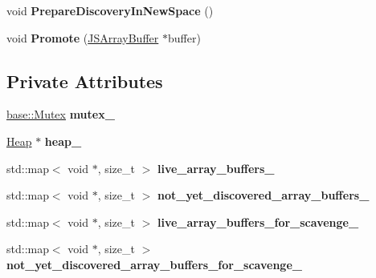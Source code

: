 \begin{DoxyCompactItemize}
\item 
void {\bfseries Prepare\+Discovery\+In\+New\+Space} ()\hypertarget{classv8_1_1internal_1_1_array_buffer_tracker_a8498b5c0a908de9e03a3e48288857129}{}\label{classv8_1_1internal_1_1_array_buffer_tracker_a8498b5c0a908de9e03a3e48288857129}

\item 
void {\bfseries Promote} (\hyperlink{classv8_1_1internal_1_1_j_s_array_buffer}{J\+S\+Array\+Buffer} $\ast$buffer)\hypertarget{classv8_1_1internal_1_1_array_buffer_tracker_a2192e34668b32c0138186f3ec5a1069e}{}\label{classv8_1_1internal_1_1_array_buffer_tracker_a2192e34668b32c0138186f3ec5a1069e}

\end{DoxyCompactItemize}
\subsection*{Private Attributes}
\begin{DoxyCompactItemize}
\item 
\hyperlink{classv8_1_1base_1_1_mutex}{base\+::\+Mutex} {\bfseries mutex\+\_\+}\hypertarget{classv8_1_1internal_1_1_array_buffer_tracker_af46b03f57cc3c41ec2804aaaca724941}{}\label{classv8_1_1internal_1_1_array_buffer_tracker_af46b03f57cc3c41ec2804aaaca724941}

\item 
\hyperlink{classv8_1_1internal_1_1_heap}{Heap} $\ast$ {\bfseries heap\+\_\+}\hypertarget{classv8_1_1internal_1_1_array_buffer_tracker_ade46351b214fce01c0d6274edae30b9b}{}\label{classv8_1_1internal_1_1_array_buffer_tracker_ade46351b214fce01c0d6274edae30b9b}

\item 
std\+::map$<$ void $\ast$, size\+\_\+t $>$ {\bfseries live\+\_\+array\+\_\+buffers\+\_\+}\hypertarget{classv8_1_1internal_1_1_array_buffer_tracker_ae4efd1407eb796a22ee9e1814ca894bd}{}\label{classv8_1_1internal_1_1_array_buffer_tracker_ae4efd1407eb796a22ee9e1814ca894bd}

\item 
std\+::map$<$ void $\ast$, size\+\_\+t $>$ {\bfseries not\+\_\+yet\+\_\+discovered\+\_\+array\+\_\+buffers\+\_\+}\hypertarget{classv8_1_1internal_1_1_array_buffer_tracker_a74bed629bdb228be46d04c70c4584d19}{}\label{classv8_1_1internal_1_1_array_buffer_tracker_a74bed629bdb228be46d04c70c4584d19}

\item 
std\+::map$<$ void $\ast$, size\+\_\+t $>$ {\bfseries live\+\_\+array\+\_\+buffers\+\_\+for\+\_\+scavenge\+\_\+}\hypertarget{classv8_1_1internal_1_1_array_buffer_tracker_a4db5dc805b7fa92a3e27c7d50b1b54dc}{}\label{classv8_1_1internal_1_1_array_buffer_tracker_a4db5dc805b7fa92a3e27c7d50b1b54dc}

\item 
std\+::map$<$ void $\ast$, size\+\_\+t $>$ {\bfseries not\+\_\+yet\+\_\+discovered\+\_\+array\+\_\+buffers\+\_\+for\+\_\+scavenge\+\_\+}\hypertarget{classv8_1_1internal_1_1_array_buffer_tracker_a8d762f9133170f4c1adbc50e251ae4d0}{}\label{classv8_1_1internal_1_1_array_buffer_tracker_a8d762f9133170f4c1adbc50e251ae4d0}

\end{DoxyCompactItemize}


